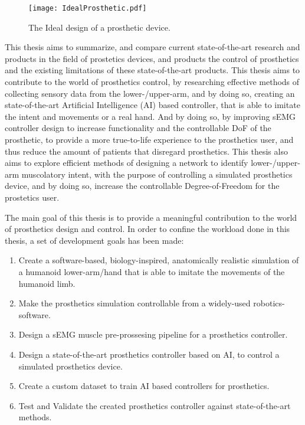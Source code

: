 \documentclass[../main.tex]{subfiles}
\begin{document}
\begin{figure}[h]
\begin{center}
\texttt{[image: IdealProsthetic.pdf]}
\caption{The Ideal design of a prosthetic device.}
\label{fig:idealprosthetic}
\end{center}
\end{figure}



This thesis aims to summarize, and compare current state-of-the-art research and products in the field of prostetics devices, and products the control of prosthetics and the existing limitations of these state-of-the-art products. 
This thesis aims to contribute to the world of prosthetics control, by researching effective methods of collecting sensory data from the lower-/upper-arm, and by doing so, creating an state-of-the-art Artificial Intelligence (AI) based controller, that is able to imitate the intent and movements or a real hand.
And by doing so, by improving sEMG controller design to increase functionality and the controllable DoF of the prosthetic, to provide a more true-to-life experience to the prosthetics user, and thus reduce the amount of patients that disregard prosthetics.
This thesis also aims to explore efficient methods of designing a network to identify lower-/upper-arm muscolatory intent, with the purpose of controlling a simulated prosthetics device, and by doing so, increase the controllable Degree-of-Freedom for the prostetics user.


The main goal of this thesis is to provide a meaningful contribution to the world of prosthetics design and control.
In order to confine the workload done in this thesis, a set of development goals has been made:

\begin{enumerate}
\item Create a software-based, biology-inspired, anatomically realistic simulation of a humanoid lower-arm/hand that is able to imitate the movements of the humanoid limb.
\item Make the prosthetics simulation controllable from a widely-used robotics-software.
\item Design a sEMG muscle pre-prossesing pipeline for a prosthetics controller. 
\item Design a state-of-the-art prosthetics controller based on AI, to control a simulated prosthetics device.
\item Create a custom dataset to train AI based controllers for prosthetics.
\item Test and Validate the created prosthetics controller against state-of-the-art methods.
\end{enumerate}
\end{document}
